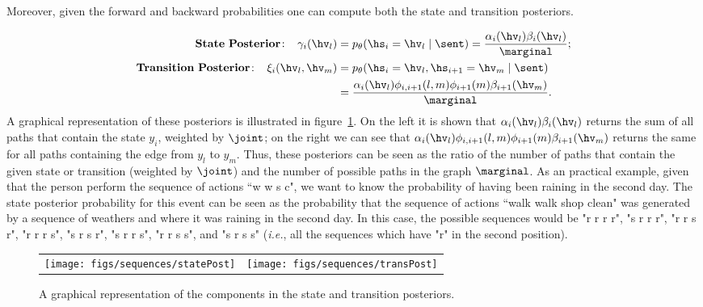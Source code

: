 Moreover, given the forward and backward probabilities one can compute both the state
and transition posteriors.

\begin{align}
 \mathbf{State \ Posterior\!:}\;\;\;\;   \gamma_i(\hv_l) &= p_\theta(\hs_i = \hv_l \mid \sent) = \frac{\alpha_i(\hv_l) \beta_i(\hv_l)}{\marginal}; \label{eq::nodePosterior2} \\
 \mathbf{Transition \ Posterior\!:}\;\;\;\;  \xi_i(\hv_l,\hv_m) &= p_\theta(\hs_i = \hv_l, \hs_{i+1}= \hv_m  \mid \sent) \nonumber\\
 &=  \frac{\alpha_i(\hv_l) \phi_{i,i+1}(l,m)\phi_{i+1}(m)\beta_{i+1}(\hv_m)}{\marginal}.\label{eq::edgePosterior2}
\end{align}
A graphical representation of these posteriors is illustrated in figure~\ref{fig:posteriors}. 
On the left it is shown that $\alpha_i(\hv_l) \beta_i(\hv_l)$ returns the sum of all paths that contain the state $y_i$, weighted by $\joint$; on the right we can see that $\alpha_i(\hv_l) \phi_{i,i+1}(l,m)\phi_{i+1}(m)\beta_{i+1}(\hv_m)$ returns the same for all paths containing the edge from $y_l$ to $y_m$.
Thus, these posteriors can be seen as the ratio of the number of paths that contain the given state or transition (weighted by $\joint$) and the number of possible paths in the graph $\marginal$.
As an practical example, given that the person perform the sequence of actions ``w w s c", we want to know the probability of having been raining in the second day. The state posterior probability for this event can be seen as the probability that the sequence of actions ``walk walk shop clean" was generated by a sequence of weathers and where it was raining in the second day. In this case, the possible sequences would be "r r r r", "s r r r", "r r s r", "r r r s", "s r s r", "s r r s", "r r s s", and "s r s s" (\emph{i.e.}, all the sequences which have "r" in the second position).

\begin{figure}
\begin{center}
\begin{tabular}{cc}

\texttt{[image: figs/sequences/statePost]}
& \texttt{[image: figs/sequences/transPost]}\\
\end{tabular}
\caption[Posterior Illustration.]{\label{fig:posteriors} A graphical representation of the components in the state and transition posteriors.}

\end{center}
\end{figure}

